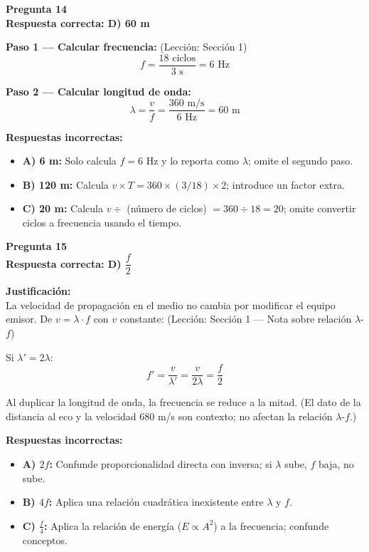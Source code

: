 \begin{respuestabox}
\textbf{Pregunta 14}\\
\textcolor{verdecorrecto}{\textbf{Respuesta correcta: D) 60 m}}

\textbf{Paso 1 — Calcular frecuencia:} (Lección: Sección 1)
$$f = \frac{18 \text{ ciclos}}{3 \text{ s}} = 6 \text{ Hz}$$

\textbf{Paso 2 — Calcular longitud de onda:}
$$\lambda = \frac{v}{f} = \frac{360 \text{ m/s}}{6 \text{ Hz}} = 60 \text{ m}$$

\textbf{Respuestas incorrectas:}
\begin{itemize}
    \item \textbf{A) 6 m:} Solo calcula $f = 6$ Hz y lo reporta como $\lambda$; omite el segundo paso.
    \item \textbf{B) 120 m:} Calcula $v \times T = 360 \times (3/18) \times 2$; introduce un factor extra.
    \item \textbf{C) 20 m:} Calcula $v \div$ (número de ciclos) $= 360 \div 18 = 20$; omite convertir ciclos a frecuencia usando el tiempo.
\end{itemize}
\end{respuestabox}
\newpage
\begin{respuestabox}
\textbf{Pregunta 15}\\
\textcolor{verdecorrecto}{\textbf{Respuesta correcta: D) $\dfrac{f}{2}$}}

\textbf{Justificación:}\\
La velocidad de propagación en el medio no cambia por modificar el equipo emisor. De $v = \lambda \cdot f$ con $v$ constante: (Lección: Sección 1 — Nota sobre relación $\lambda$-$f$)

Si $\lambda' = 2\lambda$:
$$f' = \frac{v}{\lambda'} = \frac{v}{2\lambda} = \frac{f}{2}$$

Al duplicar la longitud de onda, la frecuencia se reduce a la mitad. (El dato de la distancia al eco y la velocidad 680 m/s son contexto; no afectan la relación $\lambda$-$f$.)

\textbf{Respuestas incorrectas:}
\begin{itemize}
    \item \textbf{A) $2f$:} Confunde proporcionalidad directa con inversa; si $\lambda$ sube, $f$ baja, no sube.
    \item \textbf{B) $4f$:} Aplica una relación cuadrática inexistente entre $\lambda$ y $f$.
    \item \textbf{C) $\frac{f}{4}$:} Aplica la relación de energía ($E \propto A^2$) a la frecuencia; confunde conceptos.
\end{itemize}
\end{respuestabox}